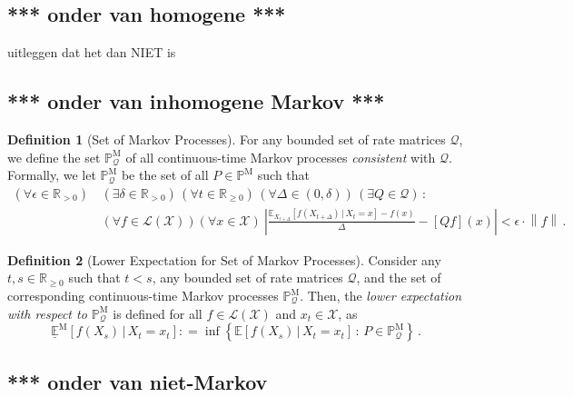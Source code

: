 \documentclass[10pt]{paper}
\theoremstyle{definition}
\newtheorem{definition}{Definition}
\newcommand{\reals}{\mathbb{R}}
\newcommand{\realspos}{\reals_{>0}}
\newcommand{\realsnonneg}{\reals_{\geq 0}}
\newcommand{\states}{\mathcal{X}}
\newcommand{\processes}{\mathbb{P}}
\newcommand{\mprocesses}{\processes^{\mathrm{M}}}
\newcommand{\gambles}{\mathcal{L}}
\newcommand{\gamblesX}{\gambles(\states)}
\newcommand{\rateset}{\mathcal{Q}}
\newcommand{\norm}[1]{\left\lVert #1 \right\rVert}
\newcommand{\coloneqq}{:\!=}
\begin{document}
\subsection{*** onder van homogene ***}

uitleggen dat het dan NIET is

\subsection{*** onder van inhomogene Markov ***}


\begin{definition}[Set of Markov Processes]\label{def:markov_process_set_new}
For any bounded set of rate matrices $\rateset$, we define the set $\mprocesses_{\rateset}$ of all continuous-time Markov processes \emph{consistent} with $\rateset$. Formally, we let $\mprocesses_{\rateset}$ be the set of all $P\in\mprocesses$ such that
\begin{align*}\label{eq:conditionforMarkov_new}
(\forall\epsilon\in\realspos)&\,
(\exists\delta\in\realspos)\,
(\forall t\in\realsnonneg)\,
(\forall\Delta\in(0,\delta))\,
(\exists Q\in\rateset)\,:\\
 &\,(\forall f\in\gamblesX)(\forall x\in\states)~
\left\lvert\frac{\mathbb{E}_{X_{t+\Delta}}[f(X_{t+\Delta})\,\vert\,X_t=x]-f(x)}{\Delta}-\left[Qf\right](x)\right\rvert<\epsilon\cdot\norm{f}\,.
\end{align*}
\end{definition}

\begin{definition}[Lower Expectation for Set of Markov Processes]\label{def:lower_markov} Consider any $t,s\in\realsnonneg$ such that $t<s$, any bounded set of rate matrices $\rateset$, and the set of corresponding continuous-time Markov processes $\mprocesses_\rateset$. Then, the \emph{lower expectation with respect to $\mprocesses_\rateset$} is defined for all $f\in\gamblesX$ and $x_t\in\states$, as
\begin{equation*}
\underline{\mathbb{E}}^\mathrm{M}[f(X_s)\,\vert\,X_t=x_t] \coloneqq \inf\left\{\mathbb{E}[f(X_s)\,\vert\,X_t=x_t]\,:\,P\in\mprocesses_\rateset\right\}\,.
\end{equation*}
\end{definition}

\subsection{*** onder van niet-Markov}
\end{document}
